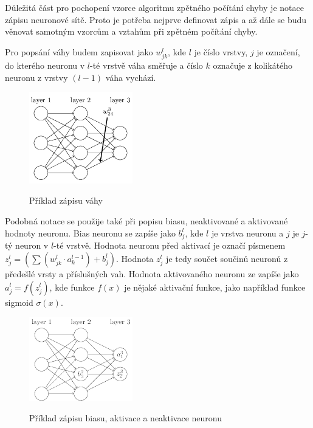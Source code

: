 Důležitá část pro pochopení vzorce algoritmu zpětného počítání chyby je notace zápisu neuronové sítě.
Proto je potřeba nejprve definovat zápis a až dále se budu věnovat samotným vzorcům a vztahům při zpětném počítání chyby.

Pro popsání váhy budem zapisovat jako \(w_{jk}^l\), kde \(l\) je číslo vrstvy, \(j\) je označení,
do kterého neuronu v \(l\)-té vrstvě váha směřuje a číslo \(k\) označuje z kolikátého neuronu z vrstvy \((l-1)\) váha vychází.

\begin{figure}[h]
    \centering
    \includegraphics[width=0.4\textwidth]{images/vaha_v_siti.png}
    \caption{Příklad zápisu váhy}\cite{vaha_v_siti}
\end{figure}

Podobná notace se použije také při popisu biasu, neaktivované a aktivované hodnoty neuronu.
Bias neuronu se zapíše jako \(b_{j}^l\), kde \(l\) je vrstva neuronu a \(j\) je \(j\)-tý neuron v \(l\)-té vrstvě.
Hodnota neuronu před aktivací je označí písmenem \(z_{j}^{l} = \left( \sum (w^{l}_{jk} \cdot a^{l-1}_k) + b^l_j \right)\).
Hodnota \(z_j^l\) je tedy součet součinů neuronů z předešlé vrsty a příslušných vah.
Hodnota aktivovaného neuronu ze zapíše jako \(a_j^l = f(z_j^l)\), kde funkce \(f(x)\) je nějaké aktivační funkce,
jako například funkce sigmoid \(\sigma(x)\).

\begin{figure}[h]
    \centering
    \includegraphics[width=0.4\textwidth]{images/bias_a_neuron.png}
    \caption{Příklad zápisu biasu, aktivace a neaktivace neuronu} \cite{bias_a_neuron}
\end{figure}

